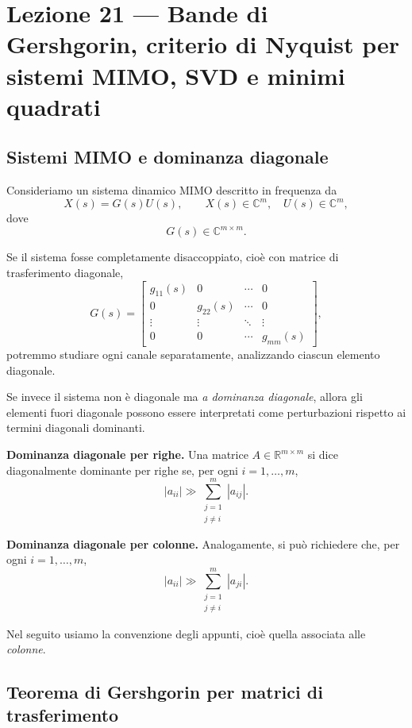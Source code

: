 \chapter{Lezione 21 --- Bande di Gershgorin, criterio di Nyquist per sistemi MIMO, SVD e minimi quadrati}

\section{Sistemi MIMO e dominanza diagonale}

Consideriamo un sistema dinamico MIMO descritto in frequenza da
\[
X(s)=G(s)U(s),
\qquad
X(s)\in\mathbb{C}^m,\quad U(s)\in\mathbb{C}^m,
\]
dove
\[
G(s)\in\mathbb{C}^{m\times m}.
\]

Se il sistema fosse completamente disaccoppiato, cioè con matrice di trasferimento diagonale,
\[
G(s)=
\begin{bmatrix}
g_{11}(s) & 0 & \cdots & 0\\
0 & g_{22}(s) & \cdots & 0\\
\vdots & \vdots & \ddots & \vdots\\
0 & 0 & \cdots & g_{mm}(s)
\end{bmatrix},
\]
potremmo studiare ogni canale separatamente, analizzando ciascun elemento diagonale.

Se invece il sistema non è diagonale ma \emph{a dominanza diagonale}, allora gli elementi fuori diagonale possono essere interpretati come perturbazioni rispetto ai termini diagonali dominanti.

\medskip

\noindent
\textbf{Dominanza diagonale per righe.}
Una matrice \(A\in\mathbb{R}^{m\times m}\) si dice diagonalmente dominante per righe se, per ogni \(i=1,\dots,m\),
\[
|a_{ii}| \gg \sum_{\substack{j=1\\j\neq i}}^{m}|a_{ij}|.
\]

\noindent
\textbf{Dominanza diagonale per colonne.}
Analogamente, si può richiedere che, per ogni \(i=1,\dots,m\),
\[
|a_{ii}| \gg \sum_{\substack{j=1\\j\neq i}}^{m}|a_{ji}|.
\]

Nel seguito usiamo la convenzione degli appunti, cioè quella associata alle \emph{colonne}.

\section{Teorema di Gershgorin per matrici di trasferimento}

